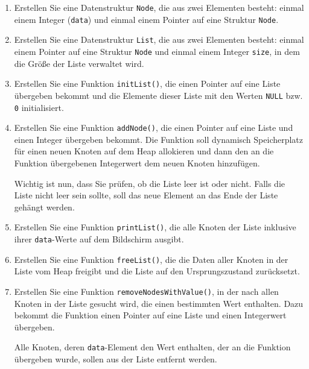 \begin{enumerate}
    \item Erstellen Sie eine Datenstruktur \texttt{Node}, die aus zwei
    Elementen besteht: einmal einem Integer (\texttt{data}) und einmal
    einem Pointer auf eine Struktur \texttt{Node}.
    \item Erstellen Sie eine Datenstruktur \texttt{List}, die aus zwei
    Elementen besteht: einmal einem Pointer auf eine Struktur
    \texttt{Node} und einmal einem Integer \texttt{size}, in dem
    die Größe der Liste verwaltet wird.
    \item Erstellen Sie eine Funktion \texttt{initList()}, die einen
    Pointer auf eine Liste übergeben bekommt und die Elemente dieser Liste mit
    den Werten \texttt{NULL} bzw. \texttt{0} initialisiert.
    \item Erstellen Sie eine Funktion \texttt{addNode()}, die einen
    Pointer auf eine Liste und einen Integer übergeben bekommt. Die Funktion
    soll dynamisch Speicherplatz für einen neuen Knoten auf dem Heap allokieren
    und dann den an die Funktion übergebenen Integerwert dem neuen Knoten
    hinzufügen.

    Wichtig ist nun, dass Sie prüfen, ob die Liste leer ist oder nicht. Falls
    die Liste nicht leer sein sollte, soll das neue Element an das Ende der
    Liste gehängt werden.
    \item Erstellen Sie eine Funktion \texttt{printList()}, die alle
    Knoten der Liste inklusive ihrer \texttt{data}-Werte auf dem
    Bildschirm ausgibt.
    \item Erstellen Sie eine Funktion \texttt{freeList()}, die die Daten
    aller Knoten in der Liste vom Heap freigibt und die Liste auf den
    Ursprungszustand zurücksetzt.
    \item Erstellen Sie eine Funktion \texttt{removeNodesWithValue()}, in
    der nach allen Knoten in der Liste gesucht wird, die einen bestimmten Wert
    enthalten. Dazu bekommt die Funktion einen Pointer auf eine Liste und einen
    Integerwert übergeben.

    Alle Knoten, deren \texttt{data}-Element den Wert enthalten, der an
    die Funktion übergeben wurde, sollen aus der Liste entfernt werden.
\end{enumerate}
